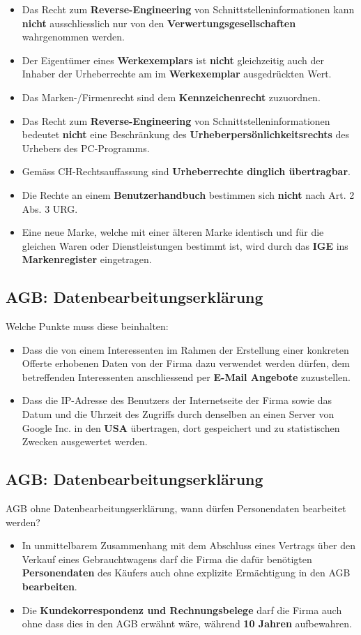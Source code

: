 \begin{itemize}
	\item Das Recht zum \textbf{Reverse-Engineering} von Schnittstelleninformationen kann \textbf{nicht} ausschliesslich nur von den \textbf{Verwertungsgesellschaften} wahrgenommen werden.
	\item Der Eigentümer eines \textbf{Werkexemplars} ist \textbf{nicht} gleichzeitig auch der Inhaber der Urheberrechte am im \textbf{Werkexemplar} ausgedrückten Wert.
	\item Das Marken-/Firmenrecht sind dem \textbf{Kennzeichenrecht} zuzuordnen.
	\item Das Recht zum \textbf{Reverse-Engineering} von Schnittstelleninformationen bedeutet \textbf{nicht} eine Beschränkung des \textbf{Urheberpersönlichkeitsrechts} des Urhebers des PC-Programms.
	\item Gemäss CH-Rechtsauffassung sind \textbf{Urheberrechte dinglich übertragbar}.
	\item Die Rechte an einem \textbf{Benutzerhandbuch} bestimmen sich \textbf{nicht} nach Art. 2 Abs. 3 URG.
	\item Eine neue Marke, welche mit einer älteren Marke identisch und für die gleichen Waren oder Dienstleistungen bestimmt ist, wird durch das \textbf{IGE} ins \textbf{Markenregister} eingetragen.
\end{itemize} 

\subsection{AGB: Datenbearbeitungserklärung}
Welche Punkte muss diese beinhalten:
\begin{itemize}
	\item Dass die von einem Interessenten im Rahmen der Erstellung einer konkreten Offerte erhobenen Daten von der Firma dazu verwendet werden dürfen, dem betreffenden Interessenten anschliessend per \textbf{E-Mail Angebote} zuzustellen.
	\item Dass die IP-Adresse des Benutzers der Internetseite der Firma sowie das Datum und die Uhrzeit des Zugriffs durch denselben an einen Server von Google Inc. in den \textbf{USA} übertragen, dort gespeichert und zu statistischen Zwecken ausgewertet werden.
\end{itemize}

\subsection{AGB: Datenbearbeitungserklärung}
AGB ohne Datenbearbeitungserklärung, wann dürfen Personendaten bearbeitet werden?
\begin{itemize}
	\item In unmittelbarem Zusammenhang mit dem Abschluss eines Vertrags über den Verkauf eines Gebrauchtwagens darf die Firma die dafür benötigten \textbf{Personendaten} des Käufers auch ohne explizite Ermächtigung in den AGB \textbf{bearbeiten}.
	\item Die \textbf{Kundekorrespondenz und Rechnungsbelege} darf die Firma auch ohne dass dies in den AGB erwähnt wäre, während \textbf{10 Jahren} aufbewahren.
\end{itemize}

